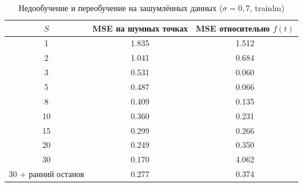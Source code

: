 \begin{table}[H]
\caption{Недообучение и переобучение на зашумлённых данных ($\sigma = 0{,}7$, trainlm)}
\label{tab:noise}
\centering
\small
\begin{tabular}{ccc}
\toprule
$S$ & MSE на шумных точках & MSE относительно $f(t)$ \\
\midrule
1 & 1.835 & 1.512 \\
2 & 1.041 & 0.684 \\
3 & 0.531 & 0.060 \\
5 & 0.487 & 0.066 \\
8 & 0.409 & 0.135 \\
10 & 0.360 & 0.231 \\
15 & 0.299 & 0.266 \\
20 & 0.249 & 0.350 \\
30 & 0.170 & 4.062 \\
30 + ранний останов & 0.277 & 0.374 \\
\bottomrule
\end{tabular}
\end{table}

